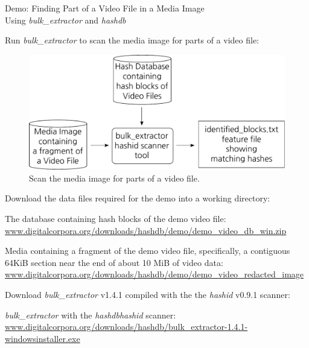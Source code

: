 \documentclass[12pt,twoside]{article}
\newcommand{\hdb}{\emph{hashdb}\xspace}
\newcommand{\bulk}{\emph{bulk\_extractor}\xspace}
\newcommand{\hashid}{\emph{hashid}\xspace}
\begin{document}
\begin{center}
\Large Demo: Finding Part of a Video File in a Media Image \\
\large Using \bulk and \hdb
\end{center}

Run \bulk to scan the media image for parts of a video file:

\begin{figure}[H]
  \center
  \includegraphics[scale=0.6]{drawings/scan_hashid}
  \caption*{Scan the media image for parts of a video file.}
  \label{fig:scan_hashid}
\end{figure}

Download the data files required for the demo into a working directory:
\begin{compactitem}
\item The database containing hash blocks of the demo video file:
\url{www.digitalcorpora.org/downloads/hashdb/demo/demo\_video\_db\_win.zip}
\item Media containing a fragment of the demo video file,
specifically, a contiguous 64KiB section
near the end of about 10 MiB of video data:
\url{www.digitalcorpora.org/downloads/hashdb/demo/demo\_video\_redacted\_image}
\end{compactitem}
Download \bulk v1.4.1 compiled with the the \hashid v0.9.1 scanner:
\begin{compactitem}
\item \bulk with the \hdb \hashid scanner:
\url{www.digitalcorpora.org/downloads/hashdb/bulk\_extractor-1.4.1-windowsinstaller.exe}
\end{compactitem}
\end{document}
